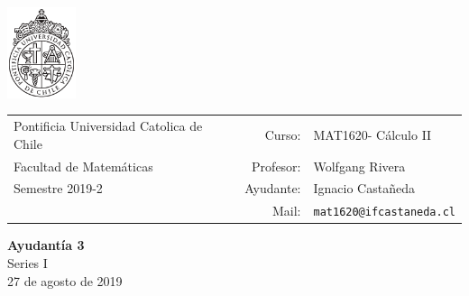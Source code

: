 \documentclass[12pt]{article}
\makeatletter
\newcommand{\ayudantia}{{\sc Ayudantía 3}}
\newcommand{\tituloayu}{Series I}
\newcommand{\fecha}{27 de agosto de 2019}
\newcommand{\sigla}{MAT1620}
\newcommand{\nombre}{Cálculo II}
\newcommand{\profesor}{Wolfgang Rivera}
\newcommand{\ano}{2019}
\newcommand{\semestre}{2}
\newcommand{\mail}{mat1620@ifcastaneda.cl}
\makeatother
\begin{document}
\thispagestyle{empty}

\begin{minipage}{2cm}
	\includegraphics[width=2cm]{../../../../img/logo.pdf}
	\vspace{0.5cm}
\end{minipage}
\begin{minipage}{\linewidth}
	\begin{tabular}{lrl}
		{\scriptsize\sc Pontificia Universidad Catolica de Chile} & \hspace*{0.7in}Curso: &
		\sigla  - \nombre\\
		{\sc Facultad de Matemáticas}&
		Profesor: & \profesor \\
		{\sc Semestre \ano-\semestre} & Ayudante: & {Ignacio Castañeda}\\
		& {Mail:} & \texttt{\mail}
	\end{tabular}
\end{minipage}

\vspace{-10mm}
\begin{center}
	{\LARGE\bf \ayudantia}\\
	\vspace{0.1cm}
	{\tituloayu}\\
	\vspace{0.1cm}
	\fecha\\
	\vspace{0.4cm}
\end{center}
\end{document}

